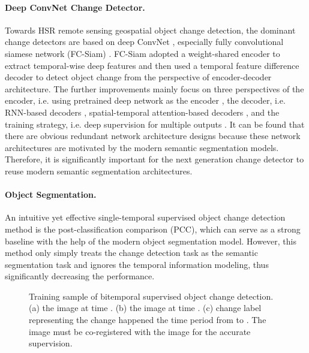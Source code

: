 \documentclass[10pt,twocolumn,letterpaper]{article}
\begin{document}
\paragraph{Deep ConvNet Change Detector.}
Towards HSR remote sensing geospatial object change detection, the dominant change detectors are based on deep ConvNet \cite{NIPS2012_c399862d}, especially fully convolutional siamese network (FC-Siam) \cite{daudt2018fully}.
FC-Siam adopted a weight-shared encoder to extract temporal-wise deep features and then used a temporal feature difference decoder to detect object change from the perspective of encoder-decoder architecture.
The further improvements mainly focus on three perspectives of the encoder, i.e. using pretrained deep network as the encoder \cite{chen2020spatial, zhang2020deeply}, the decoder, i.e. RNN-based decoders \cite{mou2018learning, chen2019change}, spatial-temporal attention-based decoders \cite{chen2020spatial,zhang2020deeply}, and the training strategy, i.e. deep supervision for multiple outputs \cite{peng2019end,zhang2020deeply}.
It can be found that there are obvious redundant network architecture designs because these network architectures are motivated by the modern semantic segmentation models.
Therefore, it is significantly important for the next generation change detector to reuse modern semantic segmentation architectures.

\vspace{-0.2in}
\paragraph{Object Segmentation.}
An intuitive yet effective single-temporal supervised object change detection method is the post-classification comparison (PCC), which can serve as a strong baseline with the help of the modern object segmentation model.
However, this method only simply treats the change detection task as the semantic segmentation task and ignores the temporal information modeling, thus significantly decreasing the performance.


\begin{figure}[htb]
  \centering
  \vspace{-0.1in}
  \caption{Training sample of bitemporal supervised object change detection. (a) the image at time . (b) the image at time . (c) change label representing the change happened the time period from  to .
  The  image must be co-registered with the  image for the accurate supervision.
  }
  \label{fig:training_sample}
\end{figure}
\end{document}

